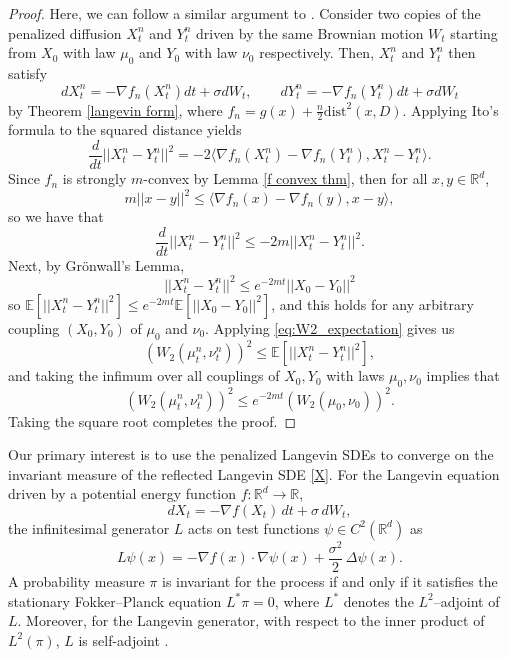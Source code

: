 \documentclass[amsfonts, reqno]{amsart}
\theoremstyle{definition}
\theoremstyle{remark}
\newcommand{\bbR}{\mathbb{R}}
\newcommand{\dist}{\text{dist}}
\numberwithin{equation}{section}
\begin{document}
\begin{proof}
    Here, we can follow a similar argument to \cite{Bolley2012}. Consider two copies of the penalized diffusion $X_t^n$ and $Y_t^n$ driven by the same Brownian motion $W_t$ starting from $X_0$ with law $\mu_0$ and $Y_0$ with law $\nu_0$ respectively. Then, $X_t^n$ and $Y_t^n$ then satisfy \begin{equation*}
        dX_t^n = -\nabla f_n(X_t^n)dt + \sigma dW_t, \qquad dY_t^n = -\nabla f_n(Y_t^n)dt + \sigma dW_t
    \end{equation*} by Theorem \ref{langevin form}, where $f_n = g(x) + \frac{n}{2}\dist^2(x,D)$. Applying Ito's formula to the squared distance yields \begin{equation*}
        \frac{d}{dt}||X_t^n - Y_t^n||^2 = -2\langle \nabla f_n(X_t^n) - \nabla f_n(Y_t^n), X_t^n - Y_t^n \rangle.
    \end{equation*}
    Since $f_n$ is strongly $m$-convex by Lemma \ref{f convex thm}, then for all $x,y \in \bbR^d$, \begin{equation*}
        m ||x-y||^2 \leq \langle \nabla f_n(x) - \nabla f_n(y), x - y \rangle,
    \end{equation*}
    so we have that \begin{equation*}
        \frac{d}{dt}||X_t^n - Y_t^n||^2 \leq -2m||X_t^n - Y_t^n||^2.
    \end{equation*}
    Next, by Gr\"{o}nwall's Lemma,  \begin{equation*}
        ||X_t^n - Y_t^n||^2 \leq e^{-2mt}||X_0 - Y_0||^2
    \end{equation*}
    so $\mathbb{E}[||X_t^n - Y_t^n||^2] \leq e^{-2mt}\mathbb{E}[||X_0 - Y_0||^2]$, and this holds for any arbitrary coupling $(X_0, Y_0)$ of $\mu_0$ and $\nu_0$. Applying \ref{eq:W2_expectation} gives us
    \begin{equation*}
        \left(W_2(\mu_t^n, \nu_t^n)\right)^2 \leq \mathbb{E}[||X_t^n - Y_t^n||^2],
    \end{equation*}
    and taking the infimum over all couplings of $X_0, Y_0$ with laws $\mu_0, \nu_0$ implies that \begin{equation*}
        \left(W_2(\mu_t^n, \nu_t^n)\right)^2 \leq e^{-2mt}\left(W_2(\mu_0, \nu_0)\right)^2.
    \end{equation*} Taking the square root completes the proof.
\end{proof}

Our primary interest is to use the penalized Langevin SDEs to converge on the invariant measure of the reflected Langevin SDE \eqref{X}. For the Langevin equation driven by a potential energy function $f:\mathbb{R}^d\to\mathbb{R}$,
\[
dX_t = -\nabla f(X_t)\,dt + \sigma\,dW_t,
\]
the infinitesimal generator $L$ acts on test functions 
$\psi\in C^2(\mathbb{R}^d)$ as
\[
L\psi(x) = -\nabla f(x)\cdot\nabla\psi(x)
            + \frac{\sigma^2}{2}\,\Delta\psi(x).
\]
A probability measure $\pi$ is invariant for the process if and only if it
satisfies the stationary Fokker--Planck equation $L^*\pi = 0$, where $L^*$ denotes the $L^2$–adjoint of $L$. Moreover, for the Langevin generator, with respect to the inner product of $L^2(\pi)$, $L$ is self-adjoint \cite{Kostic2024}.
\end{document}
